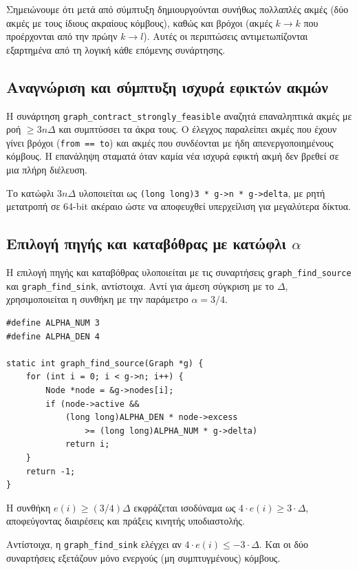 \documentclass[11pt,a4paper,oneside]{report}
\let\oldsubsection\subsection
\renewcommand{\subsection}{\FloatBarrier\oldsubsection}
\begin{document}
Σημειώνουμε ότι μετά από σύμπτυξη δημιουργούνται συνήθως πολλαπλές ακμές (δύο ακμές με τους ίδιους ακραίους κόμβους), καθώς και βρόχοι (ακμές $k \to k$ που προέρχονται από την πρώην $k \to l$). Αυτές οι περιπτώσεις αντιμετωπίζονται εξαρτημένα από τη λογική κάθε επόμενης συνάρτησης.

\subsection{Αναγνώριση και σύμπτυξη ισχυρά εφικτών ακμών}

Η συνάρτηση \texttt{graph\_contract\_strongly\_feasible} αναζητά επαναληπτικά ακμές με ροή $\geq 3n\Delta$ και συμπτύσσει τα άκρα τους. Ο έλεγχος παραλείπει ακμές που έχουν γίνει βρόχοι (\texttt{from == to}) και ακμές που συνδέονται με ήδη απενεργοποιημένους κόμβους. Η επανάληψη σταματά όταν καμία νέα ισχυρά εφικτή ακμή δεν βρεθεί σε μια πλήρη διέλευση.

Το κατώφλι $3n\Delta$ υλοποιείται ως \texttt{(long long)3 * g->n * g->delta}, με ρητή μετατροπή σε 64-\textenglish{bit} ακέραιο ώστε να αποφευχθεί υπερχείλιση για μεγαλύτερα δίκτυα.

\subsection{Επιλογή πηγής και καταβόθρας με κατώφλι $\alpha$}

Η επιλογή πηγής και καταβόθρας υλοποιείται με τις συναρτήσεις \texttt{graph\_find\_source} και \texttt{graph\_find\_sink}, αντίστοιχα. Αντί για άμεση σύγκριση με το $\Delta$, χρησιμοποιείται η συνθήκη με την παράμετρο $\alpha = 3/4$.

\begin{verbatim}
#define ALPHA_NUM 3
#define ALPHA_DEN 4

static int graph_find_source(Graph *g) {
    for (int i = 0; i < g->n; i++) {
        Node *node = &g->nodes[i];
        if (node->active &&
            (long long)ALPHA_DEN * node->excess
                >= (long long)ALPHA_NUM * g->delta)
            return i;
    }
    return -1;
}
\end{verbatim}

Η συνθήκη $e(i) \geq (3/4)\Delta$ εκφράζεται ισοδύναμα ως $4 \cdot e(i) \geq 3 \cdot \Delta$, αποφεύγοντας διαιρέσεις και πράξεις κινητής υποδιαστολής.

Αντίστοιχα, η \texttt{graph\_find\_sink} ελέγχει αν $4 \cdot e(i) \leq -3 \cdot \Delta$. Και οι δύο συναρτήσεις εξετάζουν μόνο ενεργούς (μη συμπτυγμένους) κόμβους.
\end{document}
